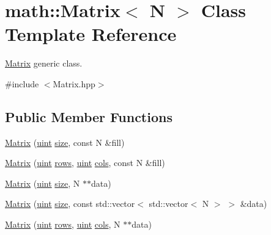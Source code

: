\hypertarget{classmath_1_1Matrix}{}\section{math\+:\+:Matrix$<$ N $>$ Class Template Reference}
\label{classmath_1_1Matrix}


\hyperlink{classmath_1_1Matrix}{Matrix} generic class.  




{\ttfamily \#include $<$Matrix.\+hpp$>$}

\subsection*{Public Member Functions}
\begin{DoxyCompactItemize}
\item 
\hyperlink{classmath_1_1Matrix_ab10d09aaec4eac52e268e1efe03fd98d}{Matrix} (\hyperlink{typedefs_8h_a7b9b9413622e67b9df7f2d090b48682b}{uint} \hyperlink{classmath_1_1Matrix_ae99135c51efc0077b694ab37ad64d5c0}{size}, const N \&fill)
\item 
\hyperlink{classmath_1_1Matrix_a0533a95efb885436489e2d8a480bb8ea}{Matrix} (\hyperlink{typedefs_8h_a7b9b9413622e67b9df7f2d090b48682b}{uint} \hyperlink{classmath_1_1Matrix_a602173645d806afe305ed77b1ff38273}{rows}, \hyperlink{typedefs_8h_a7b9b9413622e67b9df7f2d090b48682b}{uint} \hyperlink{classmath_1_1Matrix_ad78b49e12a607856df124a18a855aaf1}{cols}, const N \&fill)
\item 
\hyperlink{classmath_1_1Matrix_abaf73b37d2ce8d3d9af2c8571fbf7562}{Matrix} (\hyperlink{typedefs_8h_a7b9b9413622e67b9df7f2d090b48682b}{uint} \hyperlink{classmath_1_1Matrix_ae99135c51efc0077b694ab37ad64d5c0}{size}, N $\ast$$\ast$data)
\item 
\hyperlink{classmath_1_1Matrix_a03acfd4595068a1dbfba6ab14dad2be7}{Matrix} (\hyperlink{typedefs_8h_a7b9b9413622e67b9df7f2d090b48682b}{uint} \hyperlink{classmath_1_1Matrix_ae99135c51efc0077b694ab37ad64d5c0}{size}, const std\+::vector$<$ std\+::vector$<$ N $>$ $>$ \&data)
\item 
\hyperlink{classmath_1_1Matrix_aad0dcb59979136dc4d864bcc782f1d15}{Matrix} (\hyperlink{typedefs_8h_a7b9b9413622e67b9df7f2d090b48682b}{uint} \hyperlink{classmath_1_1Matrix_a602173645d806afe305ed77b1ff38273}{rows}, \hyperlink{typedefs_8h_a7b9b9413622e67b9df7f2d090b48682b}{uint} \hyperlink{classmath_1_1Matrix_ad78b49e12a607856df124a18a855aaf1}{cols}, N $\ast$$\ast$data)
\item 

\end{DoxyCompactItemize}
